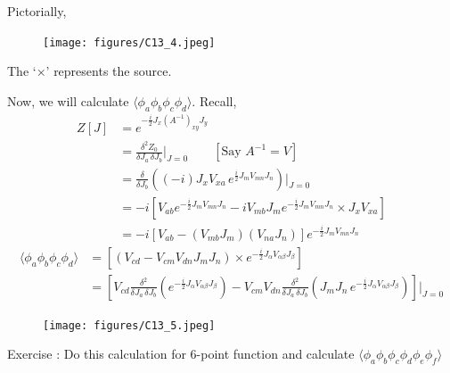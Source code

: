 \documentclass[14pt]{article} %
\begin{document}
Pictorially,
\begin{figure}[H]
    \centering
    \texttt{[image: figures/C13\_4.jpeg]}
    \caption*{}
\end{figure}
\vspace{-1.5cm}
\begin{center}
    The `$\mathbf{\times}$' represents the source.
\end{center}
Now, we will calculate $\langle \phi_a \phi_b \phi_c \phi_d \rangle$. Recall,
\begin{align*}
Z[J] &= e^{-\frac{i}{2} J_x (A^{-1})_{xy} J_y} \\
&= \frac{\delta^2 Z_0}{\delta J_a \, \delta J_b} \Bigg|_{J=0} \qquad [\text{Say }A^{-1} = V]\\
&=\frac{\delta}{\delta J_b} \left( (-i) J_x V_{x a} \, e^{\frac{i}{2} J_m V_{mn} J_n} \right) \bigg|_{J=0} \\
&= -i \left[ V_{ab} e^{-\frac i2 J_m V_{mn} J_n } -i V_{mb} J_m e^{-\frac i2 J_m V_{mn} J_n } \times J_x V_{xa} \right] \\
&= -i \left[ V_{ab} - (V_{mb} J_m) (V_{na} J_n) \right] e^{-\frac i2 J_m V_{mn} J_n } 
\end{align*}
\begin{align*}
\langle \phi_a \phi_b \phi_c \phi_d \rangle 
&= \left[ (V_{cd}-V_{cm}V_{dn} J_m J_n) \times e^{- \frac i2 J_\alpha V_{\alpha \beta} J_\beta} \right] \\
&= \left[ V_{cd} \frac{\delta^2}{\delta J_a \, \delta J_b}\left( e^{- \frac i2 J_\alpha V_{\alpha \beta} J_\beta} \right) - V_{cm} V_{dn} \frac{\delta^2}{\delta J_a \, \delta J_b}\left( J_m J_n \, e^{- \frac i2 J_\alpha V_{\alpha \beta} J_\beta} \right) \right] \Bigg|_{J=0}
\end{align*}
\vspace{-0.5cm}
\begin{figure}[H]
    \centering
    \texttt{[image: figures/C13\_5.jpeg]}
    \caption*{}
\end{figure}
\vspace{-1.5cm}
\begin{framed}
Exercise : Do this calculation for 6-point function and calculate $\langle \phi_a \phi_b \phi_c \phi_d \phi_e \phi_f\rangle $
\end{framed}
\end{document}
